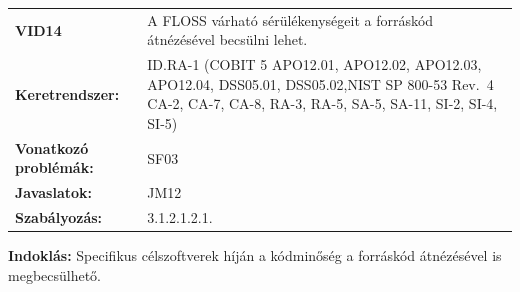 \documentclass[12pt,magyar,a4paper,oneside]{scrreprt}
\begin{document}
\begin{longtable}[]{@{}ll@{}}
\toprule
\endhead
\begin{minipage}[t]{0.16\columnwidth}\raggedright
\textbf{VID14}\strut
\end{minipage} & \begin{minipage}[t]{0.79\columnwidth}\raggedright
A FLOSS várható sérülékenységeit a forráskód átnézésével becsülni
lehet.\strut
\end{minipage}\tabularnewline
\begin{minipage}[t]{0.16\columnwidth}\raggedright
\textbf{Keretrendszer:}\strut
\end{minipage} & \begin{minipage}[t]{0.79\columnwidth}\raggedright
ID.RA-1 (COBIT 5 APO12.01, APO12.02, APO12.03, APO12.04, DSS05.01,
DSS05.02,NIST SP 800-53 Rev.~4 CA-2, CA-7, CA-8, RA-3, RA-5, SA-5,
SA-11, SI-2, SI-4, SI-5)\strut
\end{minipage}\tabularnewline
\begin{minipage}[t]{0.16\columnwidth}\raggedright
\textbf{Vonatkozó problémák:}\strut
\end{minipage} & \begin{minipage}[t]{0.79\columnwidth}\raggedright
SF03\strut
\end{minipage}\tabularnewline
\begin{minipage}[t]{0.16\columnwidth}\raggedright
\textbf{Javaslatok:}\strut
\end{minipage} & \begin{minipage}[t]{0.79\columnwidth}\raggedright
JM12\strut
\end{minipage}\tabularnewline
\begin{minipage}[t]{0.16\columnwidth}\raggedright
\textbf{Szabályozás:}\strut
\end{minipage} & \begin{minipage}[t]{0.79\columnwidth}\raggedright
3.1.2.1.2.1.\strut
\end{minipage}\tabularnewline
\bottomrule
\end{longtable}

\textbf{Indoklás: } Specifikus célszoftverek híján a kódminőség a
forráskód átnézésével is megbecsülhető.
\end{document}
